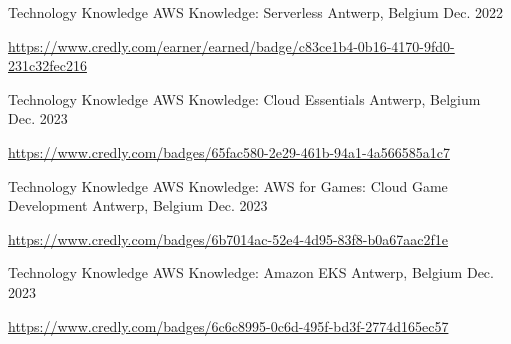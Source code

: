 \begin{cventries}
\cventry
{Technology Knowledge} %
{AWS Knowledge: Serverless} %
{Antwerp, Belgium} %
{Dec. 2022} %
{
  \begin{cvitems} %
    \item \url{https://www.credly.com/earner/earned/badge/c83ce1b4-0b16-4170-9fd0-231c32fec216}
  \end{cvitems}
}

\cventry
{Technology Knowledge} %
{AWS Knowledge: Cloud Essentials} %
{Antwerp, Belgium} %
{Dec. 2023} %
{
  \begin{cvitems} %
    \item \url{https://www.credly.com/badges/65fac580-2e29-461b-94a1-4a566585a1c7}
  \end{cvitems}
}

\cventry
{Technology Knowledge} %
{AWS Knowledge: AWS for Games: Cloud Game Development} %
{Antwerp, Belgium} %
{Dec. 2023} %
{
  \begin{cvitems} %
    \item \url{https://www.credly.com/badges/6b7014ac-52e4-4d95-83f8-b0a67aac2f1e}
  \end{cvitems}
}

\cventry
{Technology Knowledge} %
{AWS Knowledge: Amazon EKS} %
{Antwerp, Belgium} %
{Dec. 2023} %
{
  \begin{cvitems} %
    \item \url{https://www.credly.com/badges/6c6c8995-0c6d-495f-bd3f-2774d165ec57}
  \end{cvitems}
}

\end{cventries}
